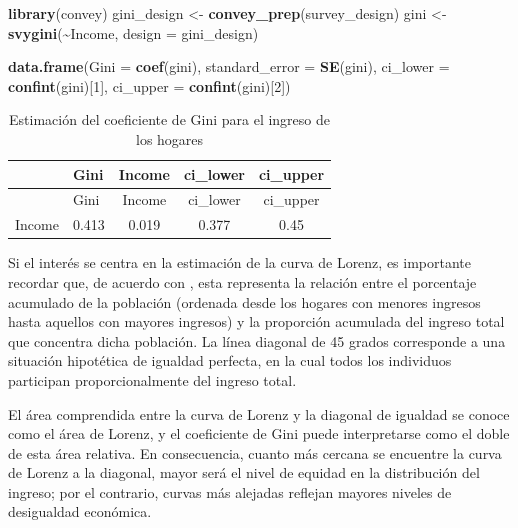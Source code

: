 \documentclass[
  spanish,
  12pt,
]{book}
\newenvironment{Shaded}{\begin{snugshade}}{\end{snugshade}}
\newcommand{\AttributeTok}[1]{\textcolor[rgb]{0.13,0.29,0.53}{#1}}
\newcommand{\DecValTok}[1]{\textcolor[rgb]{0.00,0.00,0.81}{#1}}
\newcommand{\FunctionTok}[1]{\textcolor[rgb]{0.13,0.29,0.53}{\textbf{#1}}}
\newcommand{\NormalTok}[1]{#1}
\newcommand{\OtherTok}[1]{\textcolor[rgb]{0.56,0.35,0.01}{#1}}
\newcommand{\SpecialCharTok}[1]{\textcolor[rgb]{0.81,0.36,0.00}{\textbf{#1}}}
\begin{document}
\begin{Shaded}
\begin{Highlighting}[]
\FunctionTok{library}\NormalTok{(convey)}
\NormalTok{gini\_design }\OtherTok{\textless{}{-}} \FunctionTok{convey\_prep}\NormalTok{(survey\_design)}
\NormalTok{gini }\OtherTok{\textless{}{-}} \FunctionTok{svygini}\NormalTok{(}\SpecialCharTok{\textasciitilde{}}\NormalTok{Income, }\AttributeTok{design =}\NormalTok{ gini\_design)}

\FunctionTok{data.frame}\NormalTok{(}\AttributeTok{Gini =} \FunctionTok{coef}\NormalTok{(gini),}
           \AttributeTok{standard\_error =} \FunctionTok{SE}\NormalTok{(gini),}
           \AttributeTok{ci\_lower =} \FunctionTok{confint}\NormalTok{(gini)[}\DecValTok{1}\NormalTok{],}
           \AttributeTok{ci\_upper =} \FunctionTok{confint}\NormalTok{(gini)[}\DecValTok{2}\NormalTok{])}
\end{Highlighting}
\end{Shaded}

\begin{longtable}[]{@{}llccc@{}}
\caption{\label{tab:tab-gini}Estimación del coeficiente de Gini para el ingreso de los hogares}\tabularnewline
\toprule\noalign{}
& Gini & Income & ci\_lower & ci\_upper \\
\midrule\noalign{}
\endfirsthead
\toprule\noalign{}
& Gini & Income & ci\_lower & ci\_upper \\
\midrule\noalign{}
\endhead
\bottomrule\noalign{}
\endlastfoot
Income & 0.413 & 0.019 & 0.377 & 0.45 \\
\end{longtable}

Si el interés se centra en la estimación de la curva de Lorenz, es importante recordar que, de acuerdo con \citet{kovacevic1997}, esta representa la relación entre el porcentaje acumulado de la población (ordenada desde los hogares con menores ingresos hasta aquellos con mayores ingresos) y la proporción acumulada del ingreso total que concentra dicha población. La línea diagonal de 45 grados corresponde a una situación hipotética de igualdad perfecta, en la cual todos los individuos participan proporcionalmente del ingreso total.

El área comprendida entre la curva de Lorenz y la diagonal de igualdad se conoce como el área de Lorenz, y el coeficiente de Gini puede interpretarse como el doble de esta área relativa. En consecuencia, cuanto más cercana se encuentre la curva de Lorenz a la diagonal, mayor será el nivel de equidad en la distribución del ingreso; por el contrario, curvas más alejadas reflejan mayores niveles de desigualdad económica.
\end{document}
